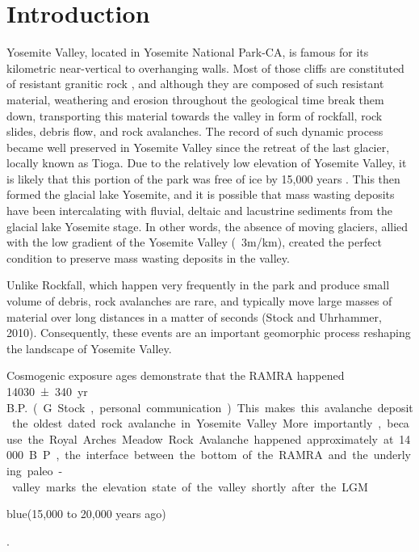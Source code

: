 \documentclass[5p]{elsarticle}
\newcommand{\COMON}{\begin{color}{blue}}
\newcommand{\COMOFF}{\end{color}}
\newcommand{\alon}{\begin{color}{red}}
\newcommand{\aloff}{\end{color}}
\begin{document}

\section{Introduction}



Yosemite Valley, located in Yosemite National Park-CA, is famous for its kilometric near-vertical to overhanging walls. Most of those cliffs are constituted of resistant granitic rock \citep{bateman1992plutonism}, and although they are composed of such resistant material, weathering and erosion throughout the geological time break them down, transporting this material towards the valley in form of rockfall, rock slides, debris flow, and rock avalanches. The record of such dynamic process became well preserved in Yosemite Valley since the retreat of the last glacier, locally known as Tioga. Due to the relatively low elevation of Yosemite Valley, it is likely that this portion of the park was free of ice by 15,000 years \citep{Wieczorek+1996}. This then formed the glacial lake Yosemite, and it is possible that mass wasting deposits have been intercalating with fluvial, deltaic and lacustrine sediments from the glacial lake Yosemite stage.   In other words, the absence of moving glaciers, allied with the low gradient of the Yosemite Valley (~3m/km), created the perfect condition to preserve mass wasting deposits in the valley. 

Unlike Rockfall, which happen very frequently in the park and produce small volume of debris, rock avalanches are rare, and typically move large masses of material over long distances in a matter of seconds (Stock and Uhrhammer, 2010). Consequently, these events are an important geomorphic process reshaping the landscape of Yosemite Valley. 

  Cosmogenic  exposure ages demonstrate that the RAMRA happened \SI{14030 \pm 340}{yr\, B.P.} (G. Stock, personal communication). This makes this avalanche deposit the oldest dated rock avalanche in Yosemite Valley. More importantly, because the Royal Arches Meadow Rock Avalanche happened approximately at 14000 B.P., the interface between the bottom of the RAMRA and the underlying paleo-valley marks the elevation state of the valley shortly after the LGM \COMON(15,000 to 20,000 years ago)\COMOFF. 
\end{document}
